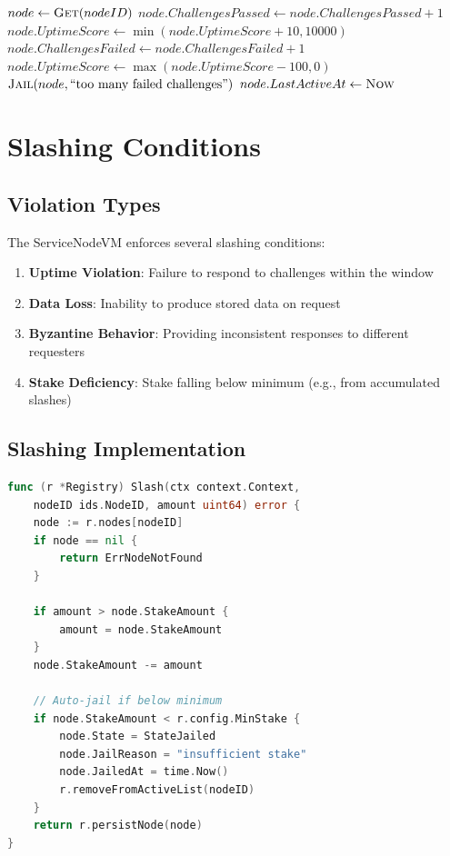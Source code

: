 \documentclass[11pt,a4paper]{article}
\begin{document}
\begin{algorithm}
\caption{Uptime Score Update}
\begin{algorithmic}[1]
    \State $node \gets \Call{Get}{nodeID}$
        \State $node.ChallengesPassed \gets node.ChallengesPassed + 1$
        \State $node.UptimeScore \gets \min(node.UptimeScore + 10, 10000)$
    \Else
        \State $node.ChallengesFailed \gets node.ChallengesFailed + 1$
        \State $node.UptimeScore \gets \max(node.UptimeScore - 100, 0)$
            \State $\Call{Jail}{node, \text{``too many failed challenges''}}$
        \EndIf
    \EndIf
    \State $node.LastActiveAt \gets \Call{Now}{}$
\EndProcedure
\end{algorithmic}
\end{algorithm}

\section{Slashing Conditions}

\subsection{Violation Types}

The ServiceNodeVM enforces several slashing conditions:

\begin{enumerate}
    \item \textbf{Uptime Violation}: Failure to respond to challenges within the window
    \item \textbf{Data Loss}: Inability to produce stored data on request
    \item \textbf{Byzantine Behavior}: Providing inconsistent responses to different requesters
    \item \textbf{Stake Deficiency}: Stake falling below minimum (e.g., from accumulated slashes)
\end{enumerate}

\subsection{Slashing Implementation}

\begin{lstlisting}[language=Go,caption={Slashing Logic}]
func (r *Registry) Slash(ctx context.Context,
    nodeID ids.NodeID, amount uint64) error {
    node := r.nodes[nodeID]
    if node == nil {
        return ErrNodeNotFound
    }

    if amount > node.StakeAmount {
        amount = node.StakeAmount
    }
    node.StakeAmount -= amount

    // Auto-jail if below minimum
    if node.StakeAmount < r.config.MinStake {
        node.State = StateJailed
        node.JailReason = "insufficient stake"
        node.JailedAt = time.Now()
        r.removeFromActiveList(nodeID)
    }
    return r.persistNode(node)
}
\end{lstlisting}
\end{document}
